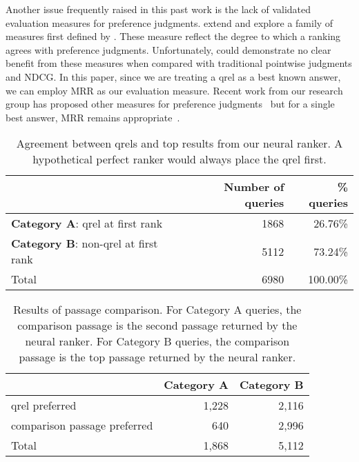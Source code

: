 \documentclass[fullpage]{article}
\begin{document}
Another issue frequently raised in this past work is the lack of validated evaluation measures for preference judgments. \citet{sz20} extend and explore a family of measures first defined by \citet{cbcd08}. These measure reflect the degree to which a ranking agrees with preference judgments. Unfortunately, \citet{sz20} could demonstrate no clear benefit from these measures when compared with traditional pointwise judgments and NDCG. In this paper, since we are treating a qrel as a best known answer, we can employ MRR as our evaluation measure.
Recent work from our research group has proposed other measures for preference judgments~\cite{cvs20,dag} but for a single best answer, MRR remains appropriate~\cite{marco21full}.


\begin{table}[t]
\centering
\begin{tabular}{|l|r|r|}
\hline
 & Number of queries & \% queries \\ \hline
{\bf Category A}: qrel  at first rank & 1868 & 26.76\% \\ \hline
{\bf Category B}: non-qrel at first rank & 5112 & 73.24\% \\ \hline
Total & 6980 & 100.00\% \\ \hline
\end{tabular}
\caption{Agreement between qrels and top results from our neural ranker. A hypothetical perfect ranker would always place the qrel first.}
\label{tab:AB}
\end{table}


\begin{table}[t]
\centering
\begin{tabular}{l|rr|}
\cline{2-3}
& \multicolumn{1}{c|}{{\bf Category A}} & \multicolumn{1}{c|}{{\bf Category B}}\\ \hline
\multicolumn{1}{|l|}{qrel preferred} & \multicolumn{1}{r|}{1,228} & 2,116 \\ \hline
\multicolumn{1}{|l|}{comparison passage preferred} & \multicolumn{1}{r|}{640} & 2,996 \\ \hline
\multicolumn{1}{|l|}{Total} & \multicolumn{1}{r|}{1,868} & 5,112 \\ \hline
\end{tabular}
\caption{
  Results of passage comparison. 
  For Category A queries, the comparison passage is the second passage returned by
  the neural ranker.
  For Category B queries, the comparison passage is the top passage returned by the
  neural ranker.
}
\label{tab:ABC}
\end{table}
\end{document}
